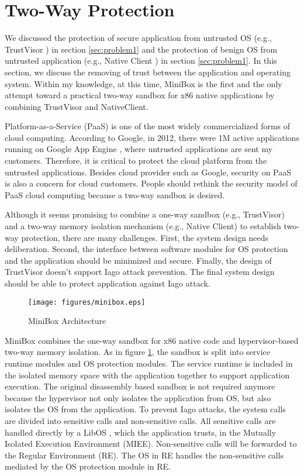\section{Two-Way Protection}
\label{sec:problem3}

We discussed the protection of secure application from untrusted OS (e.g.,
TrustVisor \cite{TrustVisor}) in section \ref{sec:problem1} and the protection
of benign OS from untrusted application (e.g., Native Client \cite{NaCl}) in
section \ref{sec:problem1}. In this section, we discuss the removing of trust
between the application and operating system. Within my knowledge, at this time,
MiniBox \cite{MiniBox} is the first and the only attempt toward a practical
two-way sandbox for x86 native applications by combining TrustVisor and
NativeClient.

Platform-as-a-Service (PaaS) is one of the most widely commercialized forms of
cloud computing. According to Google, in 2012, there were 1M active applications
running on Google App Engine \cite{engine}, where untrusted applications are sent my
customers. Therefore, it is critical to protect the cloud platform from the
untrusted applications. Besides cloud provider such as Google, security on PaaS
is also a concern for cloud customers. People should rethink the security model
of PaaS cloud computing because a two-way sandbox is desired.

Although it seems promising to combine a one-way sandbox (e.g., TrustVisor) and
a two-way memory isolation mechanism (e.g., Native Client) to establish two-way
protection, there are many challenges. First, the system design needs
deliberation. Second, the interface between software modules for OS protection
and the application should be minimized and secure. Finally, the design of
TrustVisor doesn't support Iago attack prevention. The final system design
should be able to protect application against Iago attack.

\begin{figure}[htb]
\centering
\texttt{[image: figures/minibox.eps]}
\caption{MiniBox Architecture}
\label{fig:minibox}
\end{figure}

MiniBox \cite{MiniBox} combines the one-way sandbox for x86 native code and
hypervisor-based two-way memory isolation. As in figure \ref{fig:minibox}, the
sandbox is split into service runtime modules and OS protection modules. The
service runtime is included in the isolated memory space with the application
together to support application execution. The original disassembly based
sandbox is not required anymore because the hypervisor not only isolates the
application from OS, but also isolates the OS from the application. To prevent
Iago attacks, the system calls are divided into sensitive calls and
non-sensitive calls. All sensitive calls are handled directly by a LibOS
\cite{LibOS}, which the application trusts, in the Mutually Isolated Execution
Environment (MIEE).  Non-sensitive calls will be forwarded to the Regular
Environment (RE). The OS in RE handles the non-sensitive calls mediated by the
OS protection module in RE.
